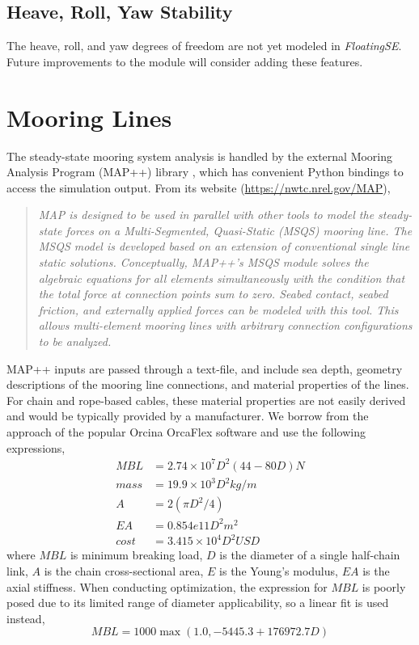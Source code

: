 \subsection{Heave, Roll, Yaw Stability}
The heave, roll, and yaw degrees of freedom are not yet modeled in
\textit{FloatingSE}.  Future improvements to the module will consider adding
these features.

\section{Mooring Lines}
The steady-state mooring system analysis is handled by the external Mooring Analysis
Program (MAP++) library \citep{MAP}, which has convenient Python bindings
to access the simulation output.  From its website
(\url{https://nwtc.nrel.gov/MAP}),
\begin{quote}
  \textit{MAP is designed to be used in parallel with other tools to model the
  steady-state forces on a Multi-Segmented, Quasi-Static (MSQS) mooring
  line. The MSQS model is developed based on an extension of
  conventional single line static solutions. Conceptually, MAP++'s MSQS
  module solves the algebraic equations for all elements simultaneously
  with the condition that the total force at connection points sum to
  zero. Seabed contact, seabed friction, and externally applied forces
  can be modeled with this tool. This allows multi-element mooring lines
  with arbitrary connection configurations to be analyzed.}
\end{quote}

MAP++ inputs are passed through a text-file, and include sea depth, geometry
descriptions of the mooring line connections, and material properties of
the lines.  For chain and rope-based cables, these material properties
are not easily derived and would be typically provided by a
manufacturer.  We borrow from the approach of the popular Orcina OrcaFlex
software \citep{orca} and use the following expressions,
\begin{align*}
MBL &= 2.74\times 10^7  D^2 \left(44 - 80D\right) \unit{N} \\
mass &= 19.9\times 10^3 D^2 \unit{kg/m}\\
A &= 2\left(\pi D^2 / 4 \right)\\
EA &= 0.854e11 D^2\unit{m^2}\\
cost &= 3.415\times 10^4 D^2 \unit{USD}
\end{align*}
where $MBL$ is minimum breaking load, $D$ is the diameter of a single
half-chain link, $A$ is the chain cross-sectional area, $E$ is the
Young's modulus, $EA$ is the axial stiffness.  When conducting
optimization, the expression for $MBL$ is poorly posed due to its limited
range of diameter applicability, so a linear fit is used instead,
\[
MBL = 1000 \max\left(1.0, -5445.3 + 176972.7 D\right)
\]  

